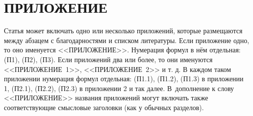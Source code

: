\documentclass[12pt, a4paper]{article}
\begin{document}
\section*{\hfill ПРИЛОЖЕНИЕ}

Статья может включать одно или несколько приложений, которые размещаются между абзацем с благодарностями и списком литературы. Если приложение одно, то оно именуется <<ПРИЛОЖЕНИЕ>>. Нумерация формул в нём отдельная: (П1), (П2), (П3). Если приложений два или более, то они именуются <<ПРИЛОЖЕНИЕ~1>>, <<ПРИЛОЖЕНИЕ~2>> и т. д. В каждом таком приложении нумерация формул отдельная: (П1.1), (П1.2), (П1.3) в приложении 1, (П2.1), (П2.2), (П2.3) в приложении 2 и так далее. В~дополнение к слову <<ПРИЛОЖЕНИЕ>> названия приложений могут включать также соответствующие смысловые заголовки (как у обычных разделов).
\end{document}
